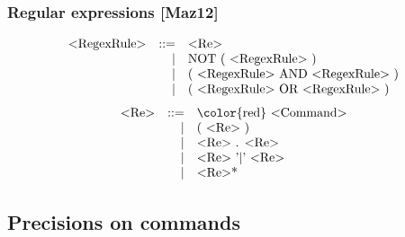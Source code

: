 \documentclass{beamer}
\begin{document}
\begin{frame}
    \frametitle{Regular expressions [Maz12]}

    \[
        \begin{array}{l r l}
            \text{<RegexRule>} & ::= & \text{<Re>} \\
                               &   | & \text{NOT ( <RegexRule> )} \\
                               &   | & \text{( <RegexRule> AND <RegexRule> )} \\
                               &   | & \text{( <RegexRule> OR <RegexRule> )} \\
        \end{array}
    \]
    \pause
    \vfill
    \[
        \begin{array}{l r l}
            \text{<Re>} & ::= & \text{{\color{red} <Command>}} \\
                        &   | & \text{( <Re> )} \\
                        &   | & \text{<Re> . <Re>} \\
                        &   | & \text{<Re> '|' <Re>} \\
                        &   | & \text{<Re>*} \\
        \end{array}
    \]

\end{frame}

\subsection{Precisions on commands}

\begin{frame}
\end{frame}
\end{document}
